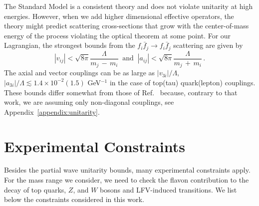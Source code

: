 \documentclass[prd,amsfonts,onecolumn,superscriptaddress,aps,nofootinbib,11pt]{revtex4-1}
\begin{document}
The Standard Model is a consistent theory and does not violate unitarity at high energies. However, when we add higher dimensional effective operators, the theory might predict scattering cross-sections that grow with the center-of-mass energy of the process violating the optical theorem at some point. For our Lagrangian, the strongest bounds from the $f_i \bar{f}_j \rightarrow f_i \bar{f}_j$ scattering are given by
%
\begin{equation}\label{eq:unitarity-bounds}
  \left|v_{ij} \right| < \sqrt{8\pi}\frac{\Lambda}{m_j\,-\,m_i} \;\;\mbox{and}\;\; \left|a_{ij} \right| < \sqrt{8\pi}\frac{\Lambda}{m_j\,+\,m_i}\, .
\end{equation}
The axial and vector couplings can be as large as $\left|v_{3i}\right|/\Lambda$, $\left|a_{3i}\right|/\Lambda \lesssim 1.4\times 10^{-2}(1.5)$ GeV$^{-1}$ in the case of top(tau) quark(lepton) couplings. These bounds differ somewhat from those of Ref.~\cite{Cornella:2019uxs} because, contrary to that work, we are assuming only non-diagonal couplings, see Appendix~\ref{appendix:unitarity}.

\section{Experimental Constraints}
\label{exp-const}
 
 Besides the partial wave unitarity bounds, many experimental constraints apply. For the mass range we consider, we need to check the flavon contribution to the decay of top quarks, $Z$, and $W$ bosons and LFV-induced transitions. We list below the constraints considered in this work.
\end{document}
